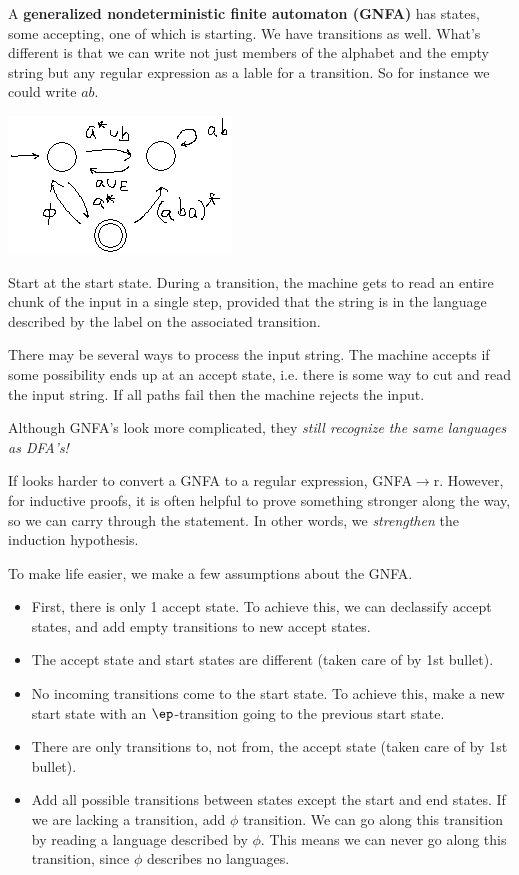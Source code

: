 A \textbf{generalized nondeterministic finite automaton (GNFA)} has states, some accepting, one of which is starting. We have transitions as well. What's different is that we can write not just members of the alphabet and the empty string but any regular expression as a lable for a transition. So for instance we could write $ab$.

\begin{center}
\includegraphics{3-1}
\end{center}

Start at the start state. During a transition, the machine gets to read an entire chunk of the input in a single step, provided that the string is in the language described by the label on the associated transition.

There may be several ways to process the input string. The machine accepts if some possibility ends up at an accept state, i.e. there is some way to cut and read the input string. If all paths fail then the machine rejects the input.

Although GNFA's look more complicated, they {\it still recognize the same languages as DFA's!}

If looks harder to convert a GNFA to a regular expression,  GNFA$\to$r. However, for inductive proofs, %
it is often helpful to prove something stronger along the way, so we can carry through the statement. In other words, we {\it strengthen} the induction hypothesis.

To make life easier, we make a few assumptions about the GNFA.
\begin{itemize}
\item
First, there is only 1 accept state. To achieve this, we can declassify accept states, and add empty transitions to new accept states. 
\item The accept state and start states are different (taken care of by 1st bullet).
\item No incoming transitions come to the start state. To achieve this, make a new start state with an $\ep$-transition going to the previous start state.
\item There are only transitions to, not from, the accept state (taken care of by 1st bullet).
\item Add all possible transitions between states except the start and end states. If we are lacking a transition, add $\phi$ transition. We can go along this transition by reading a language described by $\phi$. This means we can never go along this transition, since $\phi$ describes no languages.
\end{itemize}

